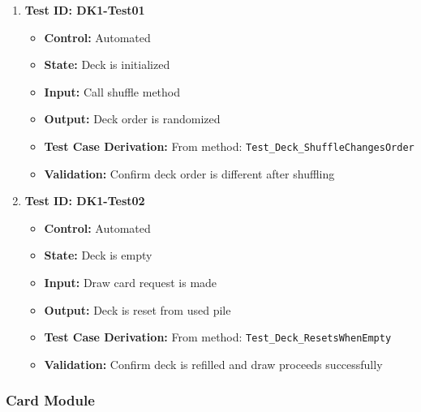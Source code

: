 \documentclass[12pt]{article}
\begin{document}
\begin{enumerate}
    \item \textbf{Test ID: DK1-Test01}
    \begin{itemize}
        \item \textbf{Control:} Automated
        \item \textbf{State:} Deck is initialized
        \item \textbf{Input:} Call shuffle method
        \item \textbf{Output:} Deck order is randomized
        \item \textbf{Test Case Derivation:} From method: \texttt{Test\_Deck\_ShuffleChangesOrder}
        \item \textbf{Validation:} Confirm deck order is different after shuffling
    \end{itemize}

    \item \textbf{Test ID: DK1-Test02}
    \begin{itemize}
        \item \textbf{Control:} Automated
        \item \textbf{State:} Deck is empty
        \item \textbf{Input:} Draw card request is made
        \item \textbf{Output:} Deck is reset from used pile
        \item \textbf{Test Case Derivation:} From method: \texttt{Test\_Deck\_ResetsWhenEmpty}
        \item \textbf{Validation:} Confirm deck is refilled and draw proceeds successfully
    \end{itemize}
\end{enumerate}

\subsubsection{Card Module}
\end{document}
